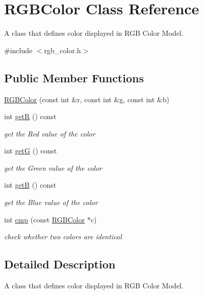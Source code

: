 \hypertarget{class_r_g_b_color}{}\section{R\+G\+B\+Color Class Reference}
\label{class_r_g_b_color}


A class that defines color displayed in R\+GB Color Model.  




{\ttfamily \#include $<$rgb\+\_\+color.\+h$>$}

\subsection*{Public Member Functions}
\begin{DoxyCompactItemize}
\item 
\mbox{\hyperlink{class_r_g_b_color_a1053304ed247f3277268cbd2c33fb00b}{R\+G\+B\+Color}} (const int \&r, const int \&g, const int \&b)
\item 
int \mbox{\hyperlink{class_r_g_b_color_af5bd4f8e515758345c1d41bbf787bf0f}{getR}} () const
\begin{DoxyCompactList}\small\item\em get the Red value of the color \end{DoxyCompactList}\item 
int \mbox{\hyperlink{class_r_g_b_color_a1d8c10aec49393fa8ed68b137352ef19}{getG}} () const
\begin{DoxyCompactList}\small\item\em get the Green value of the color \end{DoxyCompactList}\item 
int \mbox{\hyperlink{class_r_g_b_color_a55500b063148c853e65eb5b420eb4887}{getB}} () const
\begin{DoxyCompactList}\small\item\em get the Blue value of the color \end{DoxyCompactList}\item 
int \mbox{\hyperlink{class_r_g_b_color_a575ab67555a4d6b7ef65d8c6d0403f68}{cmp}} (const \mbox{\hyperlink{class_r_g_b_color}{R\+G\+B\+Color}} $\ast$c)
\begin{DoxyCompactList}\small\item\em check whether two colors are identical \end{DoxyCompactList}\end{DoxyCompactItemize}


\subsection{Detailed Description}
A class that defines color displayed in R\+GB Color Model. 

